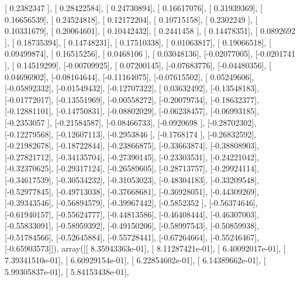 \documentclass{article}
\begin{document}
       [ 0.2382347 ],
       [ 0.28422584],
       [ 0.24730894],
       [ 0.16617076],
       [ 0.31939369],
       [ 0.16656539],
       [ 0.24524818],
       [ 0.12172204],
       [ 0.10715158],
       [ 0.2302249 ],
       [ 0.10331679],
       [ 0.20064601],
       [ 0.10442432],
       [ 0.2441458 ],
       [ 0.14478351],
       [ 0.0892692 ],
       [ 0.18735394],
       [ 0.14748231],
       [ 0.17510338],
       [ 0.01063817],
       [ 0.19066518],
       [ 0.09499874],
       [ 0.16515256],
       [ 0.0468106 ],
       [ 0.03048136],
       [-0.02077005],
       [-0.0201741 ],
       [ 0.14519299],
       [-0.00709925],
       [ 0.07200145],
       [-0.07683776],
       [-0.04480356],
       [ 0.04696902],
       [-0.08164644],
       [-0.11164075],
       [-0.07615502],
       [ 0.05249606],
       [-0.05892332],
       [-0.01549432],
       [-0.12707322],
       [ 0.03632492],
       [-0.13548183],
       [-0.01772017],
       [-0.13551969],
       [-0.00558272],
       [-0.20079734],
       [-0.18632377],
       [-0.12881101],
       [-0.14750831],
       [-0.08802029],
       [-0.06238457],
       [-0.06993185],
       [-0.2353057 ],
       [-0.21584587],
       [-0.08466733],
       [-0.0920698 ],
       [-0.28702302],
       [-0.12279568],
       [-0.12607113],
       [-0.2953846 ],
       [-0.1768174 ],
       [-0.26832592],
       [-0.21982678],
       [-0.18722844],
       [-0.23866875],
       [-0.33663874],
       [-0.38808903],
       [-0.27821712],
       [-0.34135704],
       [-0.27390145],
       [-0.23303531],
       [-0.24221042],
       [-0.32370625],
       [-0.29317124],
       [-0.26589605],
       [-0.28713757],
       [-0.29924114],
       [-0.34617539],
       [-0.30534232],
       [-0.31053023],
       [-0.48304183],
       [-0.33209548],
       [-0.52977845],
       [-0.49713038],
       [-0.37668681],
       [-0.36928051],
       [-0.44309269],
       [-0.39343546],
       [-0.56894579],
       [-0.39967442],
       [-0.5852352 ],
       [-0.56374646],
       [-0.61940157],
       [-0.55624777],
       [-0.44813586],
       [-0.46408444],
       [-0.46307003],
       [-0.55833091],
       [-0.58959392],
       [-0.49150206],
       [-0.58997543],
       [-0.50859938],
       [-0.51784566],
       [-0.52645884],
       [-0.55728441],
       [-0.67264664],
       [-0.55246467],
       [-0.65903573]]), array([[  8.35943363e-01],
       [  8.11287421e-01],
       [  6.40092017e-01],
       [  7.39341510e-01],
       [  6.60929154e-01],
       [  6.22854602e-01],
       [  6.14389662e-01],
       [  5.99305837e-01],
       [  5.84153438e-01],
\end{document}
